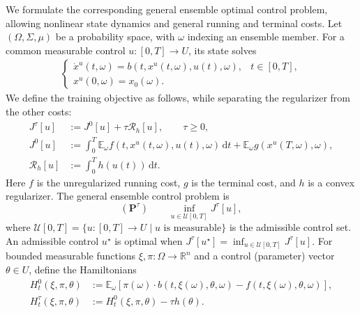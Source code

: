\documentclass[11pt]{amsart}
\numberwithin{equation}{section} %
\theoremstyle{remark}
\begin{document}
We formulate the corresponding general ensemble optimal control problem, allowing nonlinear state dynamics and general running and terminal costs. Let $(\Omega,\Sigma,\mu)$ be a probability space, with $\omega$ indexing an ensemble member. For a common measurable control $u:[0,T] \to U$, its state solves
\begin{align}\label{eq:ctrl_sys}
    \begin{cases}
        \dot x^u(t,\omega)=b(t,x^u(t,\omega),u(t),\omega),
        &t\in[0,T],\\[4pt]
        x^u(0,\omega)=x_0(\omega).
    \end{cases}
\end{align}
We define the training objective as follows, while separating the regularizer from the other costs:
\begin{align}\label{eq:cost_func_gen}
    J^\tau[u]&:=J^0[u]+\tau\mathcal R_h[u],\qquad \tau\ge0,\\
    J^0[u]&:=\int_0^T\mathbb E_\omega
    f(t,x^u(t,\omega),u(t),\omega)\,\mathrm dt
    +\mathbb E_\omega g(x^u(T,\omega),\omega),\nonumber\\
    \mathcal R_h[u]&:=\int_0^T h(u(t))\,\mathrm dt.\nonumber
\end{align}
Here $f$ is the unregularized running cost, $g$ is the terminal cost, and $h$ is a convex regularizer. The general ensemble control problem is
\[
    (\mathbf P^\tau)\qquad
    \inf_{u\in\mathcal U[0,T]}J^\tau[u],
\]
where $\mathcal U[0,T]=\{u:[0,T]\to U\mid u\text{ is measurable}\}$ is the admissible control set.
An admissible control $u^\star$ is optimal when
$J^\tau[u^\star]=\inf_{u\in\mathcal U[0,T]}J^\tau[u]$.
For bounded measurable functions $\xi,\pi:\Omega\to\mathbb R^n$ and a control (parameter) vector $\theta\in U$, define the Hamiltonians
\begin{align}
\label{eq:general-Hamiltonian-unregularized}
    H_t^0(\xi,\pi,\theta)
    &:=\mathbb E_\omega\!\left[
    \pi(\omega)\cdot b(t,\xi(\omega),\theta,\omega)
    -f(t,\xi(\omega),\theta,\omega)\right],\\
\label{eq:general-Hamiltonian-regularized}
    H_t^\tau(\xi,\pi,\theta)
    &:=H_t^0(\xi,\pi,\theta)-\tau h(\theta).
\end{align}
\end{document}
